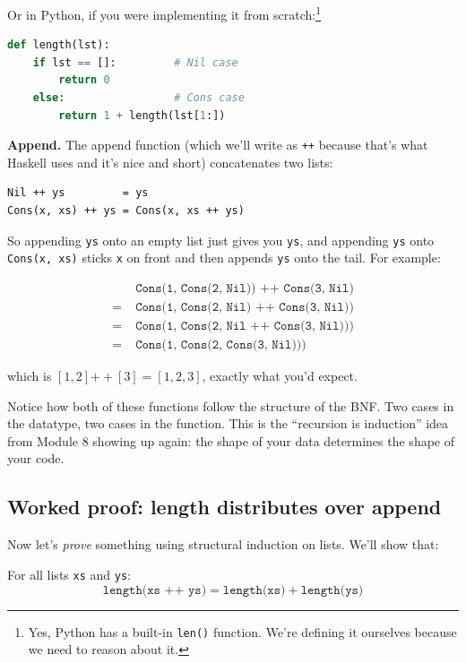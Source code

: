 \documentclass[11pt]{article}
\begin{document}
Or in Python, if you were implementing it from scratch:\footnote{Yes, Python has a built-in \texttt{len()} function. We're defining it ourselves because we need to reason about it.}

\begin{lstlisting}[language=Python]
def length(lst):
    if lst == []:         # Nil case
        return 0
    else:                 # Cons case
        return 1 + length(lst[1:])
\end{lstlisting}

\textbf{Append.} The append function (which we'll write as \texttt{++} because that's what Haskell uses and it's nice and short) concatenates two lists:

\begin{lstlisting}
Nil ++ ys         = ys
Cons(x, xs) ++ ys = Cons(x, xs ++ ys)
\end{lstlisting}

So appending \texttt{ys} onto an empty list just gives you \texttt{ys}, and appending \texttt{ys} onto \texttt{Cons(x, xs)} sticks \texttt{x} on front and then appends \texttt{ys} onto the tail. For example:

\begin{align*}
&\texttt{Cons(1, Cons(2, Nil)) ++ Cons(3, Nil)} \\
= \;&\texttt{Cons(1, Cons(2, Nil) ++ Cons(3, Nil))} \\
= \;&\texttt{Cons(1, Cons(2, Nil ++ Cons(3, Nil)))} \\
= \;&\texttt{Cons(1, Cons(2, Cons(3, Nil)))}
\end{align*}

which is $[1,2] \mathbin{++} [3] = [1,2,3]$, exactly what you'd expect.

Notice how both of these functions follow the structure of the BNF. Two cases in the datatype, two cases in the function. This is the ``recursion is induction'' idea from Module 8 showing up again: the shape of your data determines the shape of your code.

\subsection{Worked proof: length distributes over append}

Now let's \emph{prove} something using structural induction on lists. We'll show that:

For all lists \texttt{xs} and \texttt{ys}:
\[
\texttt{length(xs ++ ys)} = \texttt{length(xs)} + \texttt{length(ys)}
\]
\end{document}
